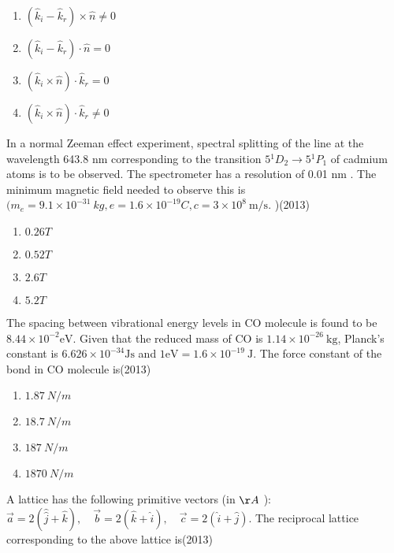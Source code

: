   \begin{multicols}{4}
			\begin{enumerate}
   \item$(\hat{k}_{i}-\hat{k}_{r}) \times \hat{n} \neq 0$
\item $(\hat{k}_{i}-\hat{k}_{r}) \cdot \hat{n}=0$
\item  $(\hat{k}_{i} \times \hat{n}) \cdot \hat{k}_{r}=0$
\item $(\hat{k}_{i} \times \hat{n}) \cdot \hat{k}_{r} \neq 0$
 \end{enumerate}
		\end{multicols}
  \item  In a normal Zeeman effect experiment, spectral splitting of the line at the wavelength 643.8 nm corresponding to the transition $5{ }^{1} D_{2} \rightarrow 5{ }^{1} P_{1}$ of cadmium atoms is to be observed. The spectrometer has a resolution of 0.01 nm . The minimum magnetic field needed to observe this is $(m_{e}=9.1 \times 10^{-31} {~kg}, e=1.6 \times 10^{-19} {C}, c=3 \times 10^{8} \mathrm{~m} / \mathrm{s}.$ )\hfill{(2013)}

 
			\begin{enumerate}
   \item $0.26 T$
\item  $0.52 T$
\item $2.6 T$
\item$5.2 T$
 \end{enumerate}
	
  \item The spacing between vibrational energy levels in CO molecule is found to be $8.44 \times 10^{-2} \mathrm{eV}$. Given that the reduced mass of CO is $1.14 \times 10^{-26} \mathrm{~kg}$, Planck's constant is $6.626 \times 10^{-34} \mathrm{Js}$ and $1 \mathrm{eV}=1.6 \times 10^{-19} \mathrm{~J}$. The force constant of the bond in CO molecule is\hfill{(2013)}

  

\begin{multicols}{4}
			\begin{enumerate}
   \item $1.87 {~N} / {m}$
\item $18.7 {~N} / {m}$
\item $187 {~N} / {m}$
\item $1870 {~N} / {m}$
\end{enumerate}
		\end{multicols}
  \item   A lattice has the following primitive vectors (in $\AA$ ): $\vec{a}=2(\hat{\hat j}+\hat{k}), \quad \vec{b}=2(\hat{k}+\hat{i}), \quad \vec{c}=2(\hat{i}+\hat{j})$. The reciprocal lattice corresponding to the above lattice is\hfill{(2013)}

